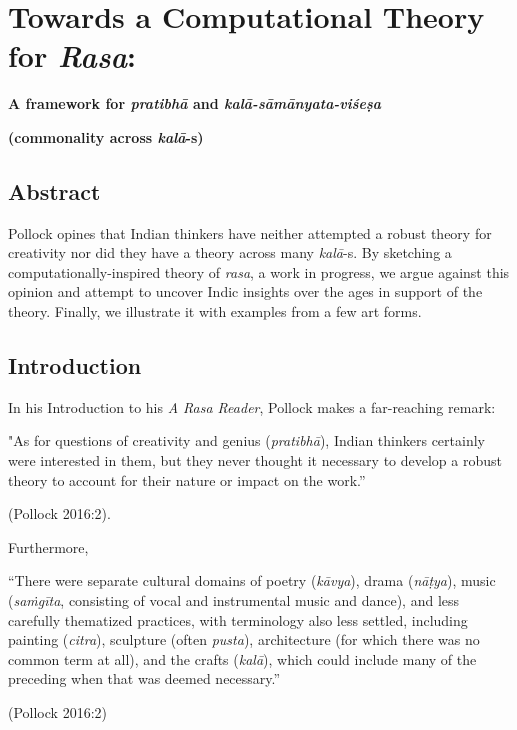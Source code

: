 \chapter[Towards a Computational Theory for \textsl{Rasa}:]{Towards a Computational Theory for \textsl{Rasa}:}\label{chapter\thechapter:begin}

\begin{center}
{\bf A framework for \textsl{pratibhā} and \textsl{kalā-sāmānyata-viśeṣa} }

{\bf (commonality across \textsl{kalā}-s)}
\end{center}


\section*{Abstract}

Pollock opines that Indian thinkers have neither attempted a robust theory for creativity nor did they have a theory across many \hbox{\textsl{kalā}-s}. By sketching a computationally-inspired theory of \textsl{rasa}, a work in progress, we argue against this opinion and attempt to uncover Indic insights over the ages in support of the theory. Finally, we illustrate it with examples from a few art forms.

\section{Introduction}\label{chap3-sec1}

In his Introduction to his \textsl{A Rasa Reader}, Pollock makes a far-reaching remark:

\begin{myquote}
"As for questions of creativity and genius (\textsl{pratibhā}), Indian thinkers certainly were interested in them, but they never thought it necessary to develop a robust theory to account for their nature or impact on the work.” 

\hfill (Pollock 2016:2).
\end{myquote}

Furthermore, 

\begin{myquote}
“There were separate cultural domains of poetry (\textsl{kāvya}), drama (\textsl{nāṭya}), music (\textsl{saṁgīta}, consisting of vocal and instrumental music and dance), and less carefully thematized practices, with terminology also less settled, including painting (\textsl{citra}), sculpture (often \textsl{pusta}), architecture (for which there was no common term at all), and the crafts (\textsl{kalā}), which could include many of the preceding when that was deemed necessary.” 

\hfill(Pollock 2016:2)
\end{myquote}

